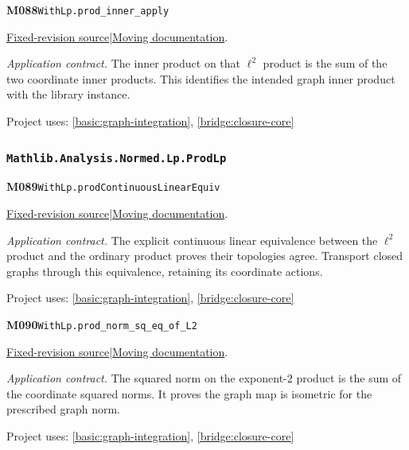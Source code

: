 \documentclass[11pt,a4paper]{article}
\theoremstyle{definition}
\theoremstyle{remark}
\begin{document}
\noindent\textbf{M088}\label{base:M088}\quad\nolinkurl{WithLp.prod_inner_apply}

\href{https://github.com/leanprover-community/mathlib4/blob/9bac2d0692944a775113f7c130fd5e5b4608a854/Mathlib/Analysis/InnerProductSpace/ProdL2.lean}{Fixed-revision source}\quad|\quad\href{https://leanprover-community.github.io/mathlib4_docs/Mathlib/Analysis/InnerProductSpace/ProdL2.html#WithLp.prod_inner_apply}{Moving documentation}.\par
\noindent\textit{Application contract.} The inner product on that $\ell^2$ product is the sum of the two coordinate inner products. This identifies the intended graph inner product with the library instance.\par
{\small Project uses: \ref{basic:graph-integration}, \ref{bridge:closure-core}}\par\medskip

\subsubsection*{\nolinkurl{Mathlib.Analysis.Normed.Lp.ProdLp}}
\noindent\textbf{M089}\label{base:M089}\quad\nolinkurl{WithLp.prodContinuousLinearEquiv}

\href{https://github.com/leanprover-community/mathlib4/blob/9bac2d0692944a775113f7c130fd5e5b4608a854/Mathlib/Analysis/Normed/Lp/ProdLp.lean}{Fixed-revision source}\quad|\quad\href{https://leanprover-community.github.io/mathlib4_docs/Mathlib/Analysis/Normed/Lp/ProdLp.html#WithLp.prodContinuousLinearEquiv}{Moving documentation}.\par
\noindent\textit{Application contract.} The explicit continuous linear equivalence between the $\ell^2$ product and the ordinary product proves their topologies agree. Transport closed graphs through this equivalence, retaining its coordinate actions.\par
{\small Project uses: \ref{basic:graph-integration}, \ref{bridge:closure-core}}\par\medskip

\noindent\textbf{M090}\label{base:M090}\quad\nolinkurl{WithLp.prod_norm_sq_eq_of_L2}

\href{https://github.com/leanprover-community/mathlib4/blob/9bac2d0692944a775113f7c130fd5e5b4608a854/Mathlib/Analysis/Normed/Lp/ProdLp.lean}{Fixed-revision source}\quad|\quad\href{https://leanprover-community.github.io/mathlib4_docs/Mathlib/Analysis/Normed/Lp/ProdLp.html#WithLp.prod_norm_sq_eq_of_L2}{Moving documentation}.\par
\noindent\textit{Application contract.} The squared norm on the exponent-$2$ product is the sum of the coordinate squared norms. It proves the graph map is isometric for the prescribed graph norm.\par
{\small Project uses: \ref{basic:graph-integration}, \ref{bridge:closure-core}}\par\medskip
\end{document}

